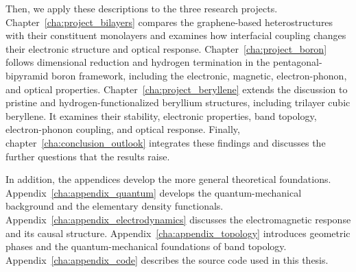 Then, we apply these descriptions to the three research projects.
Chapter~\ref{cha:project_bilayers} compares the graphene-based heterostructures with their constituent monolayers and examines how interfacial coupling changes their electronic structure and optical response.
Chapter~\ref{cha:project_boron} follows dimensional reduction and hydrogen termination in the pentagonal-bipyramid boron framework, including the electronic, magnetic, electron-phonon, and optical properties.
Chapter~\ref{cha:project_beryllene} extends the discussion to pristine and hydrogen-functionalized beryllium structures, including trilayer cubic beryllene.
It examines their stability, electronic properties, band topology, electron-phonon coupling, and optical response.
Finally, chapter~\ref{cha:conclusion_outlook} integrates these findings and discusses the further questions that the results raise.

In addition, the appendices develop the more general theoretical foundations.
Appendix~\ref{cha:appendix_quantum} develops the quantum-mechanical background and the elementary density functionals.
Appendix~\ref{cha:appendix_electrodynamics} discusses the electromagnetic response and its causal structure.
Appendix~\ref{cha:appendix_topology} introduces geometric phases and the quantum-mechanical foundations of band topology.
Appendix~\ref{cha:appendix_code} describes the source code used in this thesis.


